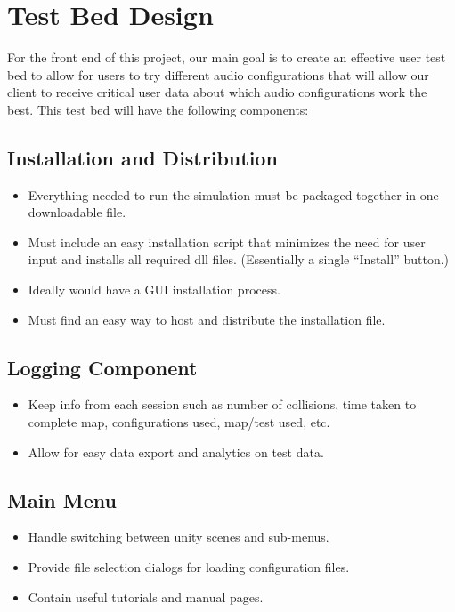 \documentclass{scrreprt}
\begin{document}
\section{Test Bed Design}
For the front end of this project, our main goal is to create an effective user test bed to allow for users to try different audio configurations that will allow our client to receive critical user data about which audio configurations work the best. This test bed will have the following components: 

\subsection{Installation and Distribution}

\begin{itemize}
  \item Everything needed to run the simulation must be packaged together in one downloadable file.
  \item Must include an easy installation script that minimizes the need for user input and installs all required dll files. (Essentially a single “Install” button.)
  \item Ideally would have a GUI installation process.
  \item Must find an easy way to host and distribute the installation file.
\end{itemize}

\subsection{Logging Component}

\begin{itemize}
  \item Keep info from each session such as number of collisions, time taken to complete map, configurations used, map/test used, etc.
  \item Allow for easy data export and analytics on test data.
\end{itemize}

\subsection{Main Menu}


\begin{itemize}
  \item Handle switching between unity scenes and sub-menus.
  \item Provide file selection dialogs for loading configuration files.
  \item Contain useful tutorials and manual pages.
\end{itemize}
\end{document}
